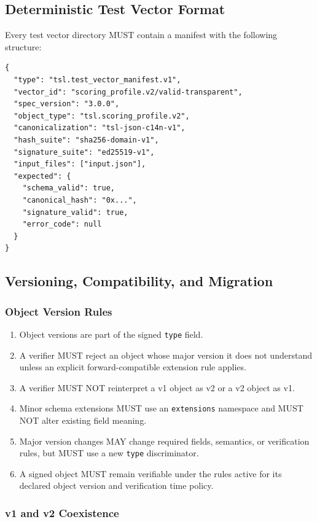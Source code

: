 \documentclass[11pt]{article}
\begin{document}
\subsection{Deterministic Test Vector Format}

Every test vector directory MUST contain a manifest with the following structure:

\begin{lstlisting}[style=tslcode]
{
  "type": "tsl.test_vector_manifest.v1",
  "vector_id": "scoring_profile.v2/valid-transparent",
  "spec_version": "3.0.0",
  "object_type": "tsl.scoring_profile.v2",
  "canonicalization": "tsl-json-c14n-v1",
  "hash_suite": "sha256-domain-v1",
  "signature_suite": "ed25519-v1",
  "input_files": ["input.json"],
  "expected": {
    "schema_valid": true,
    "canonical_hash": "0x...",
    "signature_valid": true,
    "error_code": null
  }
}
\end{lstlisting}

\subsection{Versioning, Compatibility, and Migration}

\subsubsection{Object Version Rules}

\begin{enumerate}
    \item Object versions are part of the signed \texttt{type} field.
    \item A verifier MUST reject an object whose major version it does not understand unless an explicit forward-compatible extension rule applies.
    \item A verifier MUST NOT reinterpret a v1 object as v2 or a v2 object as v1.
    \item Minor schema extensions MUST use an \texttt{extensions} namespace and MUST NOT alter existing field meaning.
    \item Major version changes MAY change required fields, semantics, or verification rules, but MUST use a new \texttt{type} discriminator.
    \item A signed object MUST remain verifiable under the rules active for its declared object version and verification time policy.
\end{enumerate}

\subsubsection{v1 and v2 Coexistence}
\end{document}

